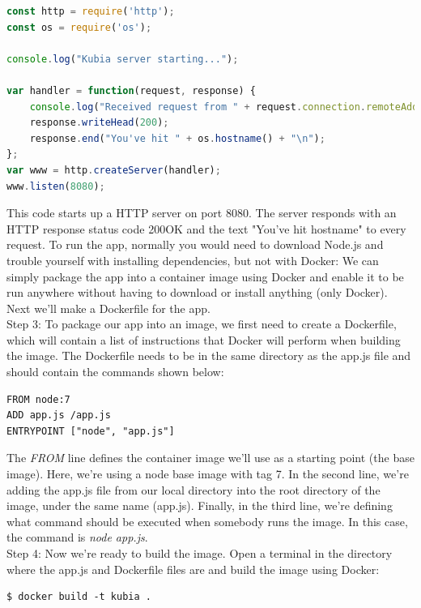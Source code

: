 \documentclass[a4paper,10pt]{article}
\begin{document}
\begin{lstlisting}[language=JavaScript, numbers=none, frame=single]
const http = require('http');
const os = require('os');

console.log("Kubia server starting...");

var handler = function(request, response) { 
	console.log("Received request from " + request.connection.remoteAddress);
	response.writeHead(200);
	response.end("You've hit " + os.hostname() + "\n");
};
var www = http.createServer(handler);
www.listen(8080);
\end{lstlisting}

This code starts up a HTTP server on port 8080. The server responds with an HTTP response status code 200OK and the text "You've hit hostname" to every request. To run the app, normally you would need to download Node.js and trouble yourself with installing dependencies, but not with Docker: We can simply package the app into a container image using Docker and enable it to be run anywhere without having to download or install anything (only Docker). Next we'll make a Dockerfile for the app. \\

Step 3: To package our app into an image, we first need to create a Dockerfile, which will contain a list of instructions  that Docker will perform when building the image. The Dockerfile needs to be in the same directory as the app.js file and should contain the commands shown below:

\begin{lstlisting}[language=Docker, numbers=none, frame=single]
FROM node:7
ADD app.js /app.js
ENTRYPOINT ["node", "app.js"]
\end{lstlisting}

The \textit{FROM} line defines the container image we'll use as a starting point (the base image). Here, we're using a node base image with tag 7. In the second line, we're adding the app.js file from our local directory into the root directory of the image, under the same name (app.js). Finally, in the third line, we're defining what command should be executed when  somebody runs the image. In this case, the command is \textit{node app.js}. \\

Step 4: Now we're ready to build the image. Open a terminal in the directory where the app.js and Dockerfile files are and build the image using Docker:

\begin{lstlisting}[numbers=none, basicstyle=\ttfamily]
$ docker build -t kubia .
\end{lstlisting}
\end{document}
